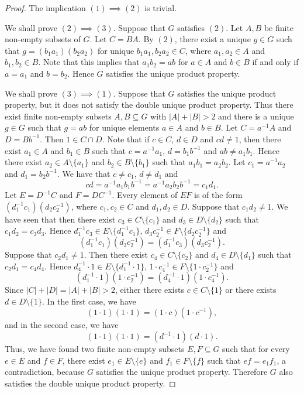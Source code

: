 \begin{proof}
	The implication $(1)\implies(2)$ is trivial.  
	
	We shall prove 	$(2)\implies(3)$. Suppose that $G$ satisfies $(2)$. Let  $A,B$ be finite non-empty subsets of $G$. Let $C=BA$.  By $(2)$, there exist a unique $g\in G$ such that $g=(b_1a_1)(b_2a_2)$ for unique $b_1a_1,b_2a_2\in C$, where $a_1,a_2\in A$ and $b_1,b_2\in B$. Note that this implies that $a_1b_2=ab$ for $a\in A$ and $b\in B$ if and only if $a=a_1$ and $b=b_2$. Hence $G$ satisfies the unique product property.
	
	We shall prove $(3)\implies(1)$. Suppose that  $G$ satisfies the unique product property, but it does not satisfy the double unique product property. Thus there exist finite non-empty subsets $A,B\subseteq G$ with $|A|+|B|>2$ and there is a unique $g\in G$ such that $g=ab$ for unique elements $a\in A$ and $b\in B$.
	Let $C=a^{-1}A$ and $D=Bb^{-1}$. Then $1\in C\cap D$. Note that if $c\in C$, $d\in D$ and $cd\neq 1$, then there exist $a_1\in A$ and $b_1\in B$ such that $c=a^{-1}a_1$, $d=b_1b^{-1}$ and $ab\neq a_1b_1$. Hence there exist $a_2\in A\setminus\{ a_1\}$ and $b_2\in B\setminus\{ b_1\}$ such that $a_1b_1=a_2b_2$. Let $c_1=a^{-1}a_2$ and $d_1=b_2b^{-1}$. We have that $c\neq c_1$, $d\neq d_1$ and 
	\[ cd=a^{-1}a_1b_1b^{-1}=a^{-1}a_2b_2b^{-1}=c_1d_1.\]
	Let $E=D^{-1}C$ and $F=DC^{-1}$. Every element of $EF$ is of the form $(d_1^{-1}c_1)(d_2c_2^{-1})$, where $c_1,c_2\in C$ and $d_1,d_2\in D$. Suppose that $c_1d_2\ne 1$. We have seen that then there exist $c_3\in C\setminus \{ c_1\}$ and $d_3\in D\setminus\{ d_2\}$ such that $c_1d_2=c_3d_3$. Hence $d_1^{-1}c_3\in E\setminus \{ d_1^{-1}c_1\}$, $d_3c_2^{-1}\in F\setminus\{ d_2c_2^{-1}\}$
	and
	\[ (d_1^{-1}c_1)(d_2c_2^{-1})=(d_1^{-1}c_3)(d_3c_2^{-1}).\]
	Suppose that $c_2d_1\neq 1$. Then there exist $c_4\in C\setminus \{ c_2\}$ and $d_4\in D\setminus\{ d_1\}$ such that $c_2d_1=c_4d_4$. Hence $d_4^{-1}\cdot 1\in E\setminus \{ d_1^{-1}\cdot 1\}$, $1\cdot c_4^{-1}\in F\setminus\{ 1\cdot c_2^{-1}\}$
	and
	\[ (d_1^{-1}\cdot 1)(1\cdot c_2^{-1})=(d_4^{-1}\cdot 1)(1\cdot c_4^{-1}).\]
	Since $|C|+|D|=|A|+|B|>2$, either there exists $c\in C\setminus\{ 1\}$ or there exists $d\in D\setminus\{ 1\}$. In the first case, we have
	\[ (1\cdot 1)(1\cdot 1)=(1\cdot c)(1\cdot c^{-1}),\]
	and in the second case, we have 
		\[ (1\cdot 1)(1\cdot 1)=(d^{-1} \cdot 1)(d\cdot 1).\]
	Thus, we have found two finite non-empty subsets $E,F\subseteq G$ such that for every $e\in E$ and $f\in F$, there exist $e_1\in E\setminus\{ e\}$ and $f_1\in F\setminus\{ f\}$ such that
	$ef=e_1f_1$, a contradiction, because $G$ satisfies the unique product property. Therefore $G$ also satisfies the double unique product property.
\end{proof}


